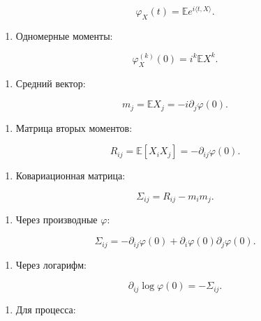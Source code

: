\documentclass[
  11pt,
  a4paper,
]{article}
\providecommand{\tightlist}{%
  \setlength{\itemsep}{0pt}\setlength{\parskip}{0pt}}
\begin{document}
\[
\varphi_X(t)=\mathbb E e^{i\langle t,X\rangle}.
\]

\begin{enumerate}
\def\labelenumi{\arabic{enumi}.}
\setcounter{enumi}{1}
\tightlist
\item
  Одномерные моменты:
\end{enumerate}

\[
\varphi_X^{(k)}(0)=i^k\mathbb EX^k.
\]

\begin{enumerate}
\def\labelenumi{\arabic{enumi}.}
\setcounter{enumi}{2}
\tightlist
\item
  Средний вектор:
\end{enumerate}

\[
m_j=\mathbb EX_j=-i\partial_j\varphi(0).
\]

\begin{enumerate}
\def\labelenumi{\arabic{enumi}.}
\setcounter{enumi}{3}
\tightlist
\item
  Матрица вторых моментов:
\end{enumerate}

\[
R_{ij}=\mathbb E[X_iX_j]=-\partial_{ij}\varphi(0).
\]

\begin{enumerate}
\def\labelenumi{\arabic{enumi}.}
\setcounter{enumi}{4}
\tightlist
\item
  Ковариационная матрица:
\end{enumerate}

\[
\Sigma_{ij}=R_{ij}-m_im_j.
\]

\begin{enumerate}
\def\labelenumi{\arabic{enumi}.}
\setcounter{enumi}{5}
\tightlist
\item
  Через производные \(\varphi\):
\end{enumerate}

\[
\Sigma_{ij}
=
-\partial_{ij}\varphi(0)
+\partial_i\varphi(0)\partial_j\varphi(0).
\]

\begin{enumerate}
\def\labelenumi{\arabic{enumi}.}
\setcounter{enumi}{6}
\tightlist
\item
  Через логарифм:
\end{enumerate}

\[
\partial_{ij}\log\varphi(0)=-\Sigma_{ij}.
\]

\begin{enumerate}
\def\labelenumi{\arabic{enumi}.}
\setcounter{enumi}{7}
\tightlist
\item
  Для процесса:
\end{enumerate}
\end{document}
